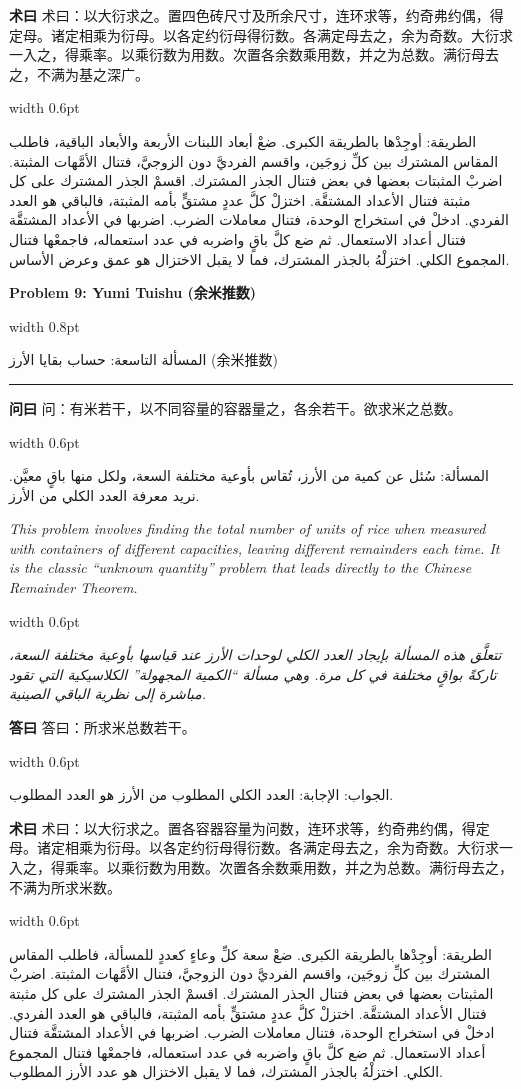 \documentclass[11pt,a4paper]{article}
\newlength{\cnwidth}
\newlength{\arwidth}
\newcommand{\paralleltext}[2]{%
  \par\medskip\noindent
  \begin{minipage}[t]{\cnwidth}%
    \small #1%
  \end{minipage}%
  \hfill\textcolor{colrule}{\vrule width 0.6pt}\hfill
  \begin{minipage}[t]{\arwidth}%
    \small\arabicfont\beginR #2\endR%
  \end{minipage}%
  \par\medskip
}
\newcommand{\parallelsection}[2]{%
  \par\bigskip\noindent
  \begin{minipage}[t]{\cnwidth}%
    \Large\bfseries\color{sectioncolor} #1%
  \end{minipage}%
  \hfill\textcolor{colrule}{\vrule width 0.8pt}\hfill
  \begin{minipage}[t]{\arwidth}%
    \Large\arabicfontbf\color{sectioncolor}\beginR #2\endR%
  \end{minipage}%
  \par\medskip\noindent\textcolor{colrule}{\rule{\textwidth}{0.6pt}}\par\medskip
}
\newcommand{\cnlabel}[1]{\textbf{\color{notecolor}#1}}
\newcommand{\arlabel}[1]{\arabicfontbf\color{notecolor}\beginR #1\endR}
\begin{document}
\paralleltext{%
\cnlabel{术曰} 术曰：以大衍求之。置四色砖尺寸及所余尺寸，连环求等，约奇弗约偶，得定母。诸定相乘为衍母。以各定约衍母得衍数。各满定母去之，余为奇数。大衍求一入之，得乘率。以乘衍数为用数。次置各余数乘用数，并之为总数。满衍母去之，不满为基之深广。%
}{%
\arlabel{الطريقة:} أوجِدْها بالطريقة الكبرى. ضعْ أبعاد اللبنات الأربعة والأبعاد الباقية، فاطلب المقاس المشترك بين كلِّ زوجَين، واقسم الفرديَّ دون الزوجيَّ، فتنال الأمَّهات المثبتة. اضربْ المثبتات بعضها في بعض فتنال الجذر المشترك. اقسمْ الجذر المشترك على كل مثبتة فتنال الأعداد المشتقَّة. اختزلْ كلَّ عددٍ مشتقٍّ بأمه المثبتة، فالباقي هو العدد الفردي. ادخلْ في استخراج الوحدة، فتنال معاملات الضرب. اضربها في الأعداد المشتقَّة فتنال أعداد الاستعمال. ثم ضع كلَّ باقٍ واضربه في عدد استعماله، فاجمعْها فتنال المجموع الكلي. اختزلْهُ بالجذر المشترك، فما لا يقبل الاختزال هو عمق وعرض الأساس.
}

\newpage

\parallelsection{Problem 9: Yumi Tuishu (余米推数)}{المسألة التاسعة: حساب بقايا الأرز (余米推数)}

\paralleltext{%
\cnlabel{问曰} 问：有米若干，以不同容量的容器量之，各余若干。欲求米之总数。%
}{%
\arlabel{المسألة:} سُئل عن كمية من الأرز، تُقاس بأوعية مختلفة السعة، ولكل منها باقٍ معيَّن. نريد معرفة العدد الكلي من الأرز.
}

\paralleltext{%
\textit{This problem involves finding the total number of units of rice when measured with containers of different capacities, leaving different remainders each time. It is the classic ``unknown quantity'' problem that leads directly to the Chinese Remainder Theorem.}%
}{%
\textit{تتعلَّق هذه المسألة بإيجاد العدد الكلي لوحدات الأرز عند قياسها بأوعية مختلفة السعة، تاركةً بواقٍ مختلفة في كل مرة. وهي مسألة ``الكمية المجهولة'' الكلاسيكية التي تقود مباشرة إلى نظرية الباقي الصينية.}
}

\paralleltext{%
\cnlabel{答曰} 答曰：所求米总数若干。%
}{%
\arlabel{الجواب:} الإجابة: العدد الكلي المطلوب من الأرز هو العدد المطلوب.
}

\paralleltext{%
\cnlabel{术曰} 术曰：以大衍求之。置各容器容量为问数，连环求等，约奇弗约偶，得定母。诸定相乘为衍母。以各定约衍母得衍数。各满定母去之，余为奇数。大衍求一入之，得乘率。以乘衍数为用数。次置各余数乘用数，并之为总数。满衍母去之，不满为所求米数。%
}{%
\arlabel{الطريقة:} أوجِدْها بالطريقة الكبرى. ضعْ سعة كلِّ وعاءٍ كعددٍ للمسألة، فاطلب المقاس المشترك بين كلِّ زوجَين، واقسم الفرديَّ دون الزوجيَّ، فتنال الأمَّهات المثبتة. اضربْ المثبتات بعضها في بعض فتنال الجذر المشترك. اقسمْ الجذر المشترك على كل مثبتة فتنال الأعداد المشتقَّة. اختزلْ كلَّ عددٍ مشتقٍّ بأمه المثبتة، فالباقي هو العدد الفردي. ادخلْ في استخراج الوحدة، فتنال معاملات الضرب. اضربها في الأعداد المشتقَّة فتنال أعداد الاستعمال. ثم ضع كلَّ باقٍ واضربه في عدد استعماله، فاجمعْها فتنال المجموع الكلي. اختزلْهُ بالجذر المشترك، فما لا يقبل الاختزال هو عدد الأرز المطلوب.
}
\end{document}
